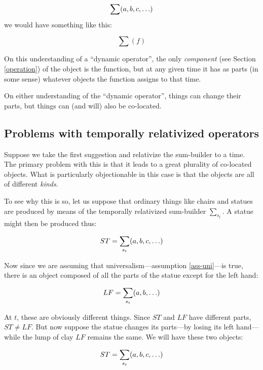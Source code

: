 \documentclass[12pt,twoside]{reedfancy}
\begin{document}
\begin{spacing}{1.25}
\begin{displaymath}
\sum (a, b, c, \mathellipsis )
\end{displaymath}
we would have something like this:

\begin{displaymath}
\sum ( f )
\end{displaymath}

On this understanding of a ``dynamic operator'', the only {\em
  component} (see Section \ref{operation}) of the object is the
function, but at any given time it has as parts (in some sense)
whatever objects the function assigns to that time.

On either understanding of the ``dynamic operator'', things can change
their parts, but things can (and will) also be co-located.

\subsection{Problems with temporally relativized operators}
\label{problems2a}
Suppose we take the first suggestion and relativize the sum-builder to
a time.  The primary problem with this is that it leads to a great
plurality of co-located objects.  What is particularly objectionable
in this case is that the objects are all of different {\em kinds}.

To see why this is so, let us suppose that ordinary things like chairs
and statues are produced by means of the temporally relativized
sum-builder $\sum_{s_t}$.  A statue might then be produced thus:

\begin{displaymath}
ST = \sum_{s_t} (a, b, c, \mathellipsis )
\end{displaymath}

Now since we are assuming that universalism---assumption
\ref{ass-uni}---is true, there is an object composed of all the parts
of the statue except for the left hand:

\begin{displaymath}
LF = \sum_{s_t} (a, b, \mathellipsis )
\end{displaymath}

At $t$, these are obviously different things.  Since $ST$ and $LF$
have different parts, $ST \neq LF$.  But now suppose the statue
changes its parts---by losing its left hand---while the lump of clay
$LF$ remains the same.  We will have these two objects:

\begin{displaymath}
ST = \sum_{s_t} (a, b, c, \mathellipsis )
\end{displaymath}


\end{spacing}
\end{document}
